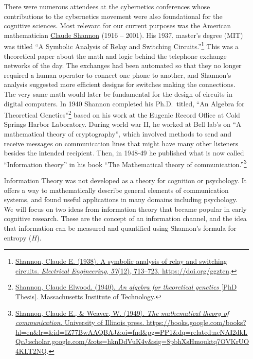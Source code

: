 \documentclass[
  oneside,
  12pt]{crumpbook}
\begin{document}
There were numerous attendees at the cybernetics conferences whose contributions to the cybernetics movement were also foundational for the cognitive sciences. Most relevant for our current purposes was the American mathematician \href{https://en.wikipedia.org/wiki/Claude_Shannon}{Claude Shannon} (1916 -- 2001). His 1937, master's degree (MIT) was titled ``A Symbolic Analysis of Relay and Switching Circuits.''\footnote{\protect\hyperlink{ref-shannonSymbolicAnalysisRelay1938}{Shannon, Claude E. (1938). A symbolic analysis of relay and switching circuits. \emph{Electrical Engineering}, \emph{57}(12), 713--723. \url{https://doi.org/ggztcn}}.} This was a theoretical paper about the math and logic behind the telephone exchange networks of the day. The exchanges had been automated so that they no longer required a human operator to connect one phone to another, and Shannon's analysis suggested more efficient designs for switches making the connections. The very same math would later be fundamental for the design of circuits in digital computers. In 1940 Shannon completed his Ph.D.~titled, ``An Algebra for Theoretical Genetics''\footnote{\protect\hyperlink{ref-shannonAlgebraTheoreticalGenetics1940}{Shannon, Claude Elwood. (1940). \emph{An algebra for theoretical genetics} {[}PhD Thesis{]}. {Massachusetts Institute of Technology}}.} based on his work at the Eugenic Record Office at Cold Springs Harbor Laboratory. During world war II, he worked at Bell lab's on ``A mathematical theory of cryptography'', which involved methods to send and receive messages on communication lines that might have many other listeners besides the intended recipient. Then, in 1948-49 he published what is now called ``Information theory'' in his book ``The Mathematical theory of communication.''\footnote{\protect\hyperlink{ref-shannonMathematicalTheoryCommunication1949}{Shannon, Claude E., \& Weaver, W. (1949). \emph{The mathematical theory of communication}. {University of Illinois press}. \url{https://books.google.com/books?hl=en\&lr=\&id=IZ77BwAAQBAJ\&oi=fnd\&pg=PP1\&dq=related:neNAI2dkLQcJ:scholar.google.com/\&ots=hknDdVuK4v\&sig=8pbhXsHmouktq7OVKrUO4KLT2NQ}}.}

Information Theory was not developed as a theory for cognition or psychology. It offers a way to mathematically describe general elements of communication systems, and found useful applications in many domains including psychology. We will focus on two ideas from information theory that became popular in early cognitive research. These are the concept of an information channel, and the idea that information can be measured and quantified using Shannon's formula for entropy (\(H\)).
\end{document}
